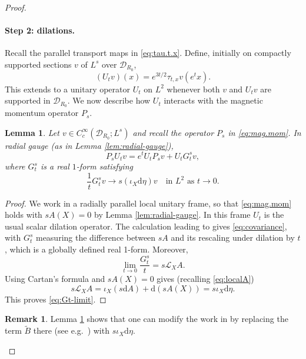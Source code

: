\documentclass{article}
\newtheorem{lem}[thm]{Lemma}
\theoremstyle{definition}
\newtheorem{rmk}[thm]{Remark}
\numberwithin{thm}{section}
\numberwithin{equation}{section}
\newcommand{\dd}{\mathrm d}
\newcommand{\Lie}{\mathcal L}
\begin{document}
\begin{proof}
\paragraph{\bf Step 2: dilations.}  Recall the parallel transport maps in \eqref{eq:tau.t.x}.  
Define, initially on compactly supported sections $v$ of $L^s$ over $\mathcal{D}_{R_0}$,
\begin{equation}\label{eq:Ut}
        (U_tv)(x)=e^{3t/2}\tau_{t,x}v(e^t x).
\end{equation}
This extends to a unitary operator $U_t$ on $L^2$ whenever both $v$ and $U_tv$ are supported in $\mathcal{D}_{R_0}$.  We now describe how $U_t$ interacts with the magnetic momentum operator $P_s$.


\begin{lem}
\label{lem:dilation-covariance}
Let $v\in C_c^\infty(\mathcal{D}_{R_0};L^s)$ and recall the operator $P_s$ in \eqref{eq:mag.mom}. In radial gauge (as in Lemma \ref{lem:radial-gauge}),
\begin{equation}\label{eq:covariance}
        P_s U_tv=e^tU_t P_s v+U_tG^s_tv,
\end{equation}
where $G^s_t$ is a real $1$-form satisfying
\begin{equation}\label{eq:Gt-limit}
        \frac1tG_t^sv\longrightarrow s(\iota_X\dd\eta) v
        \quad\text{in }L^2\text{ as }t\to0.
\end{equation}
\end{lem}

\begin{proof}
We work in a radially parallel local unitary frame, so that \eqref{eq:mag.mom} holds with $sA(X)=0$ by Lemma \ref{lem:radial-gauge}.  In this frame $U_t$ is the usual scalar dilation operator.  The calculation leading to \cite[(3.11)]{AHK} gives \eqref{eq:covariance}, 
with $G^s_t$ measuring the difference between $sA$ and its rescaling under dilation by $t$, which is a globally defined real 1-form.  Moreover,  
\begin{equation}
    \lim_{t\to 0}\frac{G^s_t}{t}=s\mathcal{L}_XA.
\end{equation}
Using Cartan's formula and $sA(X)=0$ gives (recalling \eqref{eq:localA})
\begin{equation}
      s\Lie_XA=\iota_X(s\dd A)+\dd(sA(X))=s\iota_X\dd\eta.
\end{equation}     
This proves \eqref{eq:Gt-limit}. 
\end{proof}

\begin{rmk}\label{rmk:tildeB} Lemma \ref{lem:dilation-covariance} shows that one can modify the work in \cite{AHK}  
by replacing the term $\tilde{B}$ there (see e.g.~\cite[Proposition 3.6]{AHK}) with $s\iota_X\dd\eta$.
\end{rmk}


\end{proof}
\end{document}
